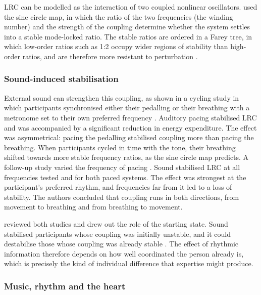 LRC can be modelled as the interaction of two coupled nonlinear oscillators. \citet{hoffmann2012} used the sine circle map, in which the ratio of the two frequencies (the winding number) and the strength of the coupling determine whether the system settles into a stable mode-locked ratio. The stable ratios are ordered in a Farey tree, in which low-order ratios such as 1:2 occupy wider regions of stability than high-order ratios, and are therefore more resistant to perturbation \citep{hoffmann2012,hoffmann2015}.

\subsubsection{Sound-induced stabilisation}

External sound can strengthen this coupling, as shown in a cycling study in which participants synchronised either their pedalling or their breathing with a metronome set to their own preferred frequency \citep{hoffmann2012}. Auditory pacing stabilised LRC and was accompanied by a significant reduction in energy expenditure. The effect was asymmetrical: pacing the pedalling stabilised coupling more than pacing the breathing. When participants cycled in time with the tone, their breathing shifted towards more stable frequency ratios, as the sine circle map predicts. A follow-up study varied the frequency of pacing \citep{hoffmann2015}. Sound stabilised LRC at all frequencies tested and for both paced systems. The effect was strongest at the participant's preferred rhythm, and frequencies far from it led to a loss of stability. The authors concluded that coupling runs in both directions, from movement to breathing and from breathing to movement.

\citet{bardy2015} reviewed both studies and drew out the role of the starting state. Sound stabilised participants whose coupling was initially unstable, and it could destabilise those whose coupling was already stable . The effect of rhythmic information therefore depends on how well coordinated the person already is, which is precisely the kind of individual difference that expertise might produce.

\subsubsection{Music, rhythm and the heart}

